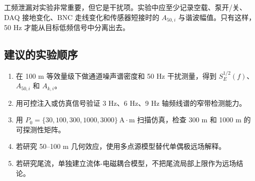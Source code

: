 工频泄漏对实验非常重要，但它是干扰项。实验中应至少记录空载、泵开/关、DAQ 接地变化、BNC 走线变化和传感器短接时的 $A_{50,i}$ 与谐波幅值。只有这样，50 Hz 才能从目标低频信号中分离出去。

\subsection{建议的实验顺序}

\begin{enumerate}
    \item 在 100 m 等效量级下做通道噪声谱密度和 50 Hz 干扰测量，得到 $S_E^{1/2}(f)$、$A_{50,i}$ 和 $A_{k,i}$。
    \item 用可控注入或仿真信号验证 3 Hz、6 Hz、9 Hz 轴频线谱的窄带检测能力。
    \item 用 $P_0=\{30,100,300,1000,3000\}\ \mathrm{A\cdot m}$ 扫描仿真，检查 300 m 和 1000 m 的可探测性矩阵。
    \item 若研究 50--100 m 几何效应，使用多点源模型替代单偶极远场解释。
    \item 若研究尾流，单独建立流体-电磁耦合模型，不把尾流局部上限作为远场结论。
\end{enumerate}

